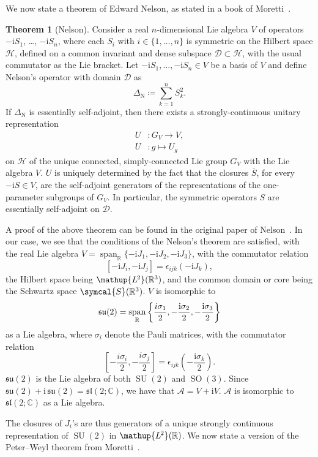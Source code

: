 \documentclass[12pt, a4 paper]{article}
\theoremstyle{definition}
\newtheorem{thm}{Theorem}
\newcommand{\ltwo}{\mathup{L\kern-0.7pt^2}}
\newcommand{\ltworthree}{\ltwo(\rr^3)}
\newcommand{\rr}{\mathbb{R}}
\newcommand{\cc}{\mathbb{C}}
\newcommand{\hilbert}{\mathcal{H}}
\newcommand{\ltwor}{\ltwo(\rr)}
\newcommand{\schwartz}{\symcal{S}}
\newcommand{\schwartzrthree}{\schwartz(\rr^3)}
\renewcommand{\i}{\mathrm{i}}
\newcommand{\domain}{\mathcal{D}}
\DeclareMathOperator{\spann}{span}
\newcommand{\sutwo}{\mathfrak{su}(2)}
\newcommand{\sltwoc}{\mathfrak{sl}(2;\cc)}
\begin{document}
	We now state a theorem of Edward Nelson, as stated in a book of Moretti~\cite[p.~291]{MorettiFundamental}.
	\begin{thm}[Nelson]
		Consider a real \(n\)-dimensional Lie algebra \(V\) of operators \(-\i S_1\), \ldots, \(-\i S_n\), where each \(S_i\) with \(i \in \{1, \ldots, n\}\) is symmetric on the Hilbert space \(\hilbert\), defined on a common invariant and dense subspace \(\domain \subset \hilbert\), with the usual commutator as the Lie bracket.
		Let \(-\i S_1, \ldots, -\i S_n \in V\) be a basis of \(V\) and define Nelson's operator with domain \(\domain\) as
		\[
			\Delta_{\mathrm{N}} \coloneq \sum_{k=1}^{n} S_k^2.
		\]
		If \(\Delta_{\mathrm{N}}\) is essentially self-adjoint, then there exists a strongly-continuous unitary representation
		\begin{align*}
		    U &\colon G_V \rightarrow V,\\
			U &\colon g \mapsto U_g
		\end{align*}
		on \(\hilbert\) of the unique connected, simply-connected Lie group \(G_V\) with the Lie algebra \(V\).
		\(U\) is uniquely determined by the fact that the closures \(\overline{S}\), for every \(-\i S \in V\), are the self-adjoint generators of the representations of the one-parameter subgroups of \(G_V\). In particular, the symmetric operators \(S\) are essentially self-adjoint on \(\domain\).
	\end{thm}
	A proof of the above theorem can be found in the original paper of Nelson~\cite{Nelson}. In our case, we see that the conditions of the Nelson's theorem are satisfied, with the real Lie algebra \(V = \spann_{\rr}\{-\i J_1, -\i J_2, -\i J_3\}\), with the commutator relation \[[-\i J_i, -\i J_j] = \epsilon_{ijk}(-\i J_k),\] the Hilbert space being \(\ltworthree\), and the common domain or core  being the Schwartz space \(\schwartzrthree\). \(V\) is isomorphic to \[\displaystyle\sutwo = \spann_{\rr}\left\{\-\frac{i\sigma_1}{2}, -\frac{\i\sigma_2}{2}, -\frac{\i\sigma_3}{2}\right\}\] as a Lie algebra, where \(\sigma_i\) denote the Pauli matrices, with the commutator relation \[\displaystyle\left[-\frac{i\sigma_i}{2}, -\frac{i\sigma_j}{2}\right] = \epsilon_{ijk}\left(-\frac{\i\sigma_k}{2}\right).\] \(\sutwo\) is the Lie algebra of both \(\operatorname{SU}(2)\) and \(\operatorname{SO}(3)\). Since \(\sutwo + \i\,\sutwo = \sltwoc\), we have that \(\mathcal{A} = V + \i V\). \(\mathcal{A}\) is isomorphic to \(\sltwoc\) as a Lie algebra.

	The closures of \(J_i\)'s are thus generators of a unique strongly continuous representation of \(\operatorname{SU}(2)\) in \(\ltwor\). We now state a version of the Peter--Weyl theorem from Moretti~\cite[p.~287]{MorettiFundamental}.
\end{document}
